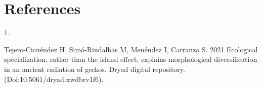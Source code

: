 \documentclass[
  11pt,
]{article}
\newlength{\cslhangindent}
\newlength{\csllabelwidth}
\newlength{\cslentryspacingunit} %
\newenvironment{CSLReferences}[2] %
 {%
  \setlength{\parindent}{0pt}
  \ifodd #1
  \let\oldpar\par
  \def\par{\hangindent=\cslhangindent\oldpar}
  \fi
  \setlength{\parskip}{#2\cslentryspacingunit}
 }%
 {}
\newcommand{\CSLLeftMargin}[1]{\parbox[t]{\csllabelwidth}{#1}}
\newcommand{\CSLRightInline}[1]{\parbox[t]{\linewidth - \csllabelwidth}{#1}\break}
\begin{document}
\newpage

\hypertarget{references}{%
\section*{References}\label{references}}

\setlength{\parindent}{-0.25in} \setlength{\leftskip}{0.25in}
\setlength{\parskip}{8pt} \noindent

\hypertarget{refs}{}
\begin{CSLReferences}{0}{0}
\leavevmode{}%
\CSLLeftMargin{1. }%
\CSLRightInline{Tejero-Cicuéndez H, Simó-Riudalbas M, Menéndez I,
Carranza S. 2021 Ecological specialization, rather than the island
effect, explains morphological diversification in an ancient radiation
of geckos. Dryad digital repository. (Doi:10.5061/dryad.xwdbrv1f6). }

\end{CSLReferences}

\newpage
\end{document}
